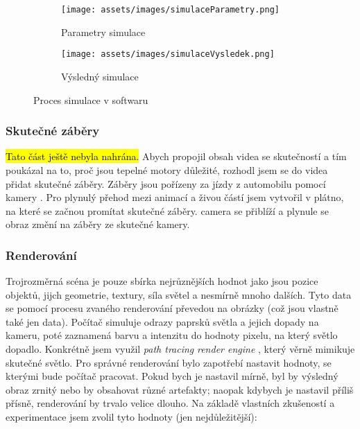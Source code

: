 \begin{figure}[H]
    \centering
    \begingroup
    \makeatletter
    \renewcommand\thesubfigure{\thefigure~--~\@nameuse{subfiglabel@\alph{subfigure}}}
    \newcommand{\subfiglabel@a}{vlevo}
    \newcommand{\subfiglabel@b}{vpravo}
    \captionsetup[subfigure]{labelformat=simple, labelsep=colon}
    \renewcommand\p@subfigure{}
    \makeatother
    \begin{subfigure}{0.35\textwidth}
        \centering
        \texttt{[image: assets/images/simulaceParametry.png]}
        \caption{Parametry simulace\\\jaObr}
    \end{subfigure}%
    \begin{subfigure}{0.6\textwidth}
        \centering
        \texttt{[image: assets/images/simulaceVysledek.png]}
        \caption{Výsledný simulace \jaObr}
    \end{subfigure}
    \endgroup
    \caption{Proces simulace v softwaru }
    \label{obr:simulace}
\end{figure}

\newpage

\subsubsection{Skutečné záběry}
\hl{Tato část ještě nebyla nahrána.}\odst
{Abych propojil obsah videa se skutečností a tím poukázal na to, proč jsou tepelné motory důležité, rozhodl jsem se do videa přidat skutečné záběry. Záběry jsou pořízeny za jízdy z automobilu pomocí kamery .}\odst
{Pro plynulý přehod mezi animací a živou částí jsem vytvořil v  plátno, na které se začnou promítat skutečné záběry.  camera se přiblíží a plynule se obraz změní na záběry ze skutečné kamery.}

\newpage

\subsubsection{Renderování}\label{sc:renderovani}
{Trojrozměrná scéna je pouze sbírka nejrůznějších hodnot jako jsou pozice objektů, jijch geometrie, textury, síla světel a nesmírně mnoho dalších. Tyto data se pomocí procesu zvaného renderování převedou na obrázky (což jsou vlastně také jen data). Počítač simuluje odrazy paprsků světla a jejich dopady na kameru, poté zaznamená barvu a intenzitu do hodnoty pixelu, na který světlo dopadlo. Konkrétně jsem využil \textit{path tracing} \textit{render engine} , který věrně mimikuje skutečné světlo.}\odst
{Pro správné renderování bylo zapotřebí nastavit hodnoty, se kterými bude počítač pracovat. Pokud bych je nastavil mírně, byl by výsledný obraz zrnitý nebo by obsahovat různé artefakty; naopak kdybych je nastavil příliš přísně, renderování by trvalo velice dlouho. Na základě vlastních zkušeností a experimentace jsem zvolil tyto hodnoty (jen nejdůležitější): }

